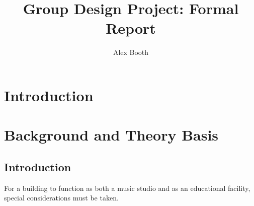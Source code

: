 \documentclass[10pt, twocolumn]{article}
\title{Group Design Project: Formal Report}
\author{Alex Booth}
\begin{document}
    \maketitle

    \section{Introduction}
        
    \section{Background and Theory Basis}
        \subsection{Introduction}
            For a building to function as both a music studio and as an educational facility, special considerations must be taken.
\end{document}
